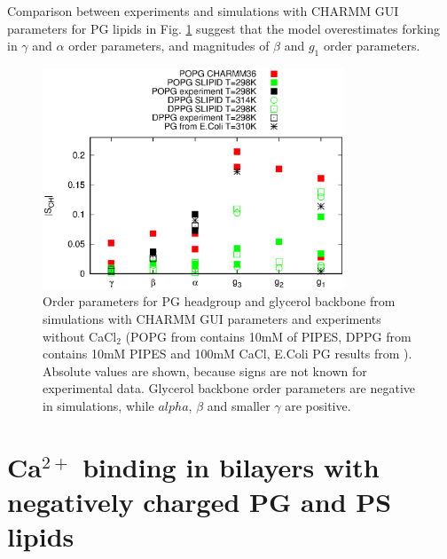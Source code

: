 \documentclass[aps,prl,superscriptaddress,twocolumn]{revtex4}
\begin{document}
Comparison between experiments and simulations with CHARMM GUI
parameters for PG lipids in Fig. \ref{HGorderParametersPOPG} suggest that
the model overestimates forking in $\gamma$ and $\alpha$ order parameters,
and magnitudes of $\beta$ and $g_1$ order parameters.
\begin{figure}[]
  \centering
  \includegraphics[width=9.0cm]{../Figs/HGorderparametersPOPG.eps}
  \caption{\label{HGorderParametersPOPG}
    Order parameters for PG headgroup and glycerol backbone from simulations with CHARMM GUI parameters and experiments without CaCl$_2$ 
    (POPG from \cite{borle85} contains 10mM of PIPES, DPPG from \cite{wohlgemuth80} contains 10mM PIPES and 100mM CaCl,
    E.Coli PG results from \cite{gally81}).
    Absolute values are shown, because signs are not known for experimental data.
    Glycerol backbone order parameters are negative in simulations, while $alpha$, $\beta$ and
    smaller $\gamma$ are positive.
  }
\end{figure}

\section{Ca$^{2+}$ binding in bilayers with negatively charged PG and PS lipids}
\end{document}
